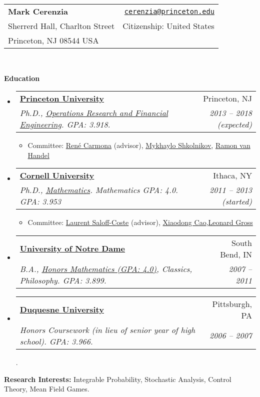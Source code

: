 \documentclass[letterpaper,11pt]{article}
\makeatletter
\newcommand{\resitem}[1]{\item #1 \vspace{-2pt}}
\newcommand{\resheading}[1]{{\large {\textbf{#1 \vphantom{p\^{E}}}}}}
\newenvironment{widetable}[1]
	       {\begin{tabular*}{#1}[t]{l@{\extracolsep{\fill}}r}}
	       {\end{tabular*}}
\newcommand{\ressubheading}[4]{
  \begin{widetable}{\textwidth - 28pt}
		\textbf{#1} & #2 \\
		\textit{#3} & \textit{#4} \\
  \end{widetable}
  \vspace{-12pt}}
\makeatother
\begin{document}
  \begin{widetable}{\textwidth}
    \textbf{\Large Mark Cerenzia}  & \href{mailto: cerenzia@princeton.edu}{\texttt{cerenzia@princeton.edu}} \\
    Sherrerd Hall, Charlton Street & Citizenship: United States \\
    Princeton, NJ 08544 USA
  \end{widetable}
\\

\vspace{0.1in}


\resheading{Education}
\begin{itemize}
\item
	\ressubheading{\href{http://www.princeton.edu/}{Princeton University}}
		      {Princeton, NJ}
		      {Ph.D., \href{http://orfe.princeton.edu}{Operations Research and Financial Engineering}. \emph{GPA: 3.918.}}{2013 -- 2018 (expected)}
	              \begin{itemize}
		        \resitem{Committee: \href{https://www.princeton.edu/~rcarmona/}{Ren\'{e} Carmona} (advisor), \href{http://www.princeton.edu/~mykhaylo/}{Mykhaylo Shkolnikov}, \href{http://www.princeton.edu/~rvan/}{Ramon van Handel}}
	              \end{itemize}
\item
	\ressubheading{\href{http://www.cornell.edu}{Cornell University}}
		      {Ithaca, NY}
		      {Ph.D., \href{http://www.math.cornell.edu}{Mathematics}. \emph{Mathematics GPA: 4.0. GPA: 3.953}}{2011 -- 2013 (started)}
	              \begin{itemize}
		        \resitem{Committee: \href{http://www.math.cornell.edu/~lsc/lau.html}{Laurent Saloff-Coste} (advisor), \href{http://www.math.cornell.edu/~cao/}{Xiaodong Cao},\href{https://www.math.cornell.edu/m/People/bynetid/lg35}{Leonard Gross}}
	              \end{itemize}

\item
	\ressubheading{\href{http://www.nd.edu}{University of Notre Dame}}
		      {South Bend, IN}
		      {B.A., \href{http://math.nd.edu/undergraduate-program/}{Honors Mathematics (GPA: 4.0)}, Classics, Philosophy. \emph{GPA: 3.899.}}
		      {2007 -- 2011}
	\item
		\ressubheading{\href{http://www.duq.edu}{Duquesne University}}
		      {Pittsburgh, PA}
		      {Honors Coursework (in lieu of senior year of high school). \emph{GPA: 3.966.}}
		      {2006 -- 2007}.

\end{itemize}
\resheading{Research Interests:}Integrable Probability, Stochastic Analysis, Control Theory, Mean Field Games.
\end{document}
